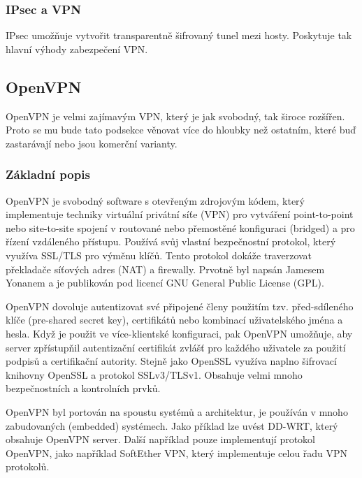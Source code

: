 \documentclass[thesis=B,czech]{FITthesis}[2012/06/26]
\begin{document}
      \subsubsection{IPsec a VPN}

        IPsec umožňuje vytvořit transparentně šifrovaný tunel mezi hosty. Poskytuje tak hlavní výhody zabezpečení VPN. \cite{ipsec_vpn}


    \subsection{OpenVPN}

      OpenVPN je velmi zajímavým VPN, který je jak svobodný, tak široce rozšířen. Proto se mu bude tato podsekce věnovat více do hloubky než ostatním, které buď zastarávají nebo jsou komerční varianty.

      \subsubsection{Základní popis}

        OpenVPN je svobodný software s otevřeným zdrojovým kódem, který implementuje techniky virtuální privátní síťe (VPN) pro vytváření point-to-point nebo site-to-site spojení v routované nebo přemostěné konfiguraci (bridged) a pro řízení vzdáleného přístupu. Používá svůj vlastní bezpečnostní protokol\cite{openvpn_basics_1}, který využíva SSL/TLS pro výměnu klíčů. Tento protokol dokáže traverzovat překladače síťových adres (NAT) a firewally. Prvotně byl napsán Jamesem Yonanem a je publikován pod licencí GNU General Public License (GPL).\cite{openvpn_basics_2}

        OpenVPN dovoluje autentizovat své připojené členy použitím tzv. před-sdíleného klíče (pre-shared secret key), certifikátů nebo kombinací uživatelského jména a hesla. Když je použit ve více-klientské konfiguraci, pak OpenVPN umožňuje, aby server zpřístupňil autentizační certifikát zvlášť pro každého uživatele za použití podpisů a certifikační autority. Stejně jako OpenSSL využíva naplno šifrovací knihovny OpenSSL a protokol SSLv3/TLSv1. Obsahuje velmi mnoho bezpečnostních a kontrolních prvků.

        OpenVPN byl portován na spoustu systémů a architektur, je používán v mnoho zabudovaných (embedded) systémech. Jako příklad lze uvést DD-WRT, který obsahuje OpenVPN server. Další například pouze implementují protokol OpenVPN, jako například SoftEther VPN, který implementuje celou řadu VPN protokolů.
\end{document}
